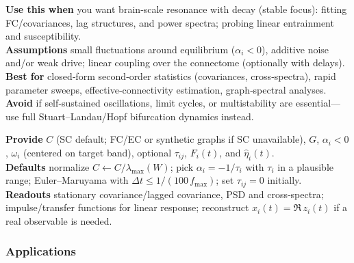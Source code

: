 \documentclass[12pt]{article}
\numberwithin{equation}{section}
\begin{document}
\begin{tcolorbox}[
  colback=gray!5,
  colframe=slate,
  colbacktitle=softblue!25,
  coltitle=softblue!60!black,
  fonttitle=\bfseries\small,
  title={\small When to Use It},
  boxrule=0.4pt, enhanced, sharp corners,
  left=4pt,right=4pt,top=3pt,bottom=3pt,
  boxsep=2pt, before skip=6pt, after skip=6pt
]
\scriptsize
\textbf{Use this when} you want brain‑scale resonance with decay (stable focus): fitting FC/covariances, lag structures, and power spectra; probing linear entrainment and susceptibility.\\
\textbf{Assumptions} small fluctuations around equilibrium ($\alpha_i<0$), additive noise and/or weak drive; linear coupling over the connectome (optionally with delays).\\
\textbf{Best for} closed‑form second‑order statistics (covariances, cross‑spectra), rapid parameter sweeps, effective‑connectivity estimation, graph‑spectral analyses.\\
\textbf{Avoid} if self‑sustained oscillations, limit cycles, or multistability are essential—use full Stuart–Landau/Hopf bifurcation dynamics instead.
\end{tcolorbox}

\begin{tcolorbox}[
  colback=gray!5,
  colframe=slate,
  colbacktitle=softblue!25,
  coltitle=softblue!60!black,
  fonttitle=\bfseries\small,
  title={\small How to Use It},
  boxrule=0.4pt, enhanced, sharp corners,
  left=4pt,right=4pt,top=3pt,bottom=3pt,
  boxsep=2pt, before skip=6pt, after skip=6pt
]
\scriptsize
\textbf{Provide} $C$ (SC default; FC/EC or synthetic graphs if SC unavailable), $G$, $\alpha_i{<}0$, $\omega_i$ (centered on target band), optional $\tau_{ij}$, $F_i(t)$, and $\hat \eta_i(t)$.\\
\textbf{Defaults} normalize $C\!\leftarrow\!C/\lambda_{\max}(W)$; pick $\alpha_i=-1/\tau_i$ with $\tau_i$ in a plausible range; Euler–Maruyama with $\Delta t\!\le\!1/(100\,f_{\max})$; set $\tau_{ij}=0$ initially.\\
\textbf{Readouts} stationary covariance/lagged covariance, PSD and cross‑spectra; impulse/transfer functions for linear response; reconstruct $x_i(t)=\Re\,z_i(t)$ if a real observable is needed.
\end{tcolorbox}



\subsubsection{Applications} 
\end{document}
